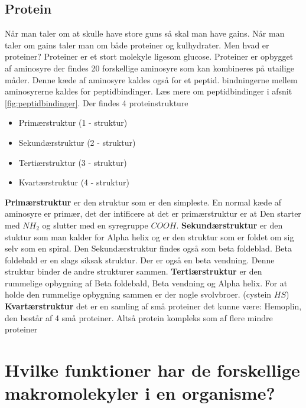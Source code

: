         \subsection{Protein}
            Når man taler om at skulle have store guns så skal man have gains. Når man taler om gains taler man om både proteiner og kulhydrater. Men hvad er proteiner? Proteiner er et stort molekyle ligesom glucose. Proteiner er opbygget af aminosyre der findes 20 forskellige aminosyre som kan kombineres på utailige måder. Denne kæde af aminosyre kaldes også for et peptid. bindningerne mellem aminosyrerne kaldes for peptidbindinger. Læs mere om  peptidbindinger i afsnit \ref{fig:peptidbindinger}. Der findes 4 proteinstrukture
            \begin{itemize}
                \item Primærstruktur (1 - struktur)
                \item Sekundærstruktur (2 - struktur)
                \item Tertiærstruktur (3 - struktur)
                \item Kvartærstruktur (4 - struktur)
            \end{itemize}
            \textbf{Primærstruktur} er den struktur som er den simpleste.
            En normal kæde af aminosyre er primær, det der intificere at det er primærstruktur er at Den starter med \begin{math}NH_2\end{math} og slutter med en syregruppe \begin{math}COOH\end{math}.
            \textbf{Sekundærstruktur} er den stuktur som man kalder for Alpha helix og er den struktur som er foldet om sig selv som en spiral. Den Sekundærstruktur findes også som beta foldeblad. Beta foldebald er en slags siksak struktur. Der er også en beta vendning. Denne struktur binder de andre strukturer sammen.
            \textbf{Tertiærstruktur} er den rummelige opbygning af Beta foldebald, Beta vendning og Alpha helix. For at holde den rummelige opbygning sammen er der nogle svolvbroer. (cystein \begin{math}HS\end{math})
           \textbf{Kvartærstruktur} det er en samling af små proteiner det kunne være: Hemoplin, den består af 4 små proteiner. Altså protein kompleks som af flere mindre proteiner


\section{Hvilke funktioner har de forskellige makromolekyler i en organisme?}
